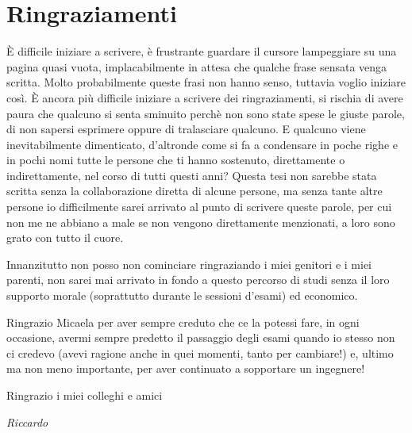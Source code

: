 \chapter*{Ringraziamenti}
È difficile iniziare a scrivere, è frustrante guardare il cursore lampeggiare 
su una pagina quasi vuota, implacabilmente in attesa che qualche frase sensata 
venga scritta. Molto probabilmente queste frasi non hanno senso, tuttavia 
voglio iniziare così. È ancora più difficile iniziare a scrivere dei 
ringraziamenti, si rischia di avere paura che qualcuno si senta sminuito perchè 
non sono state spese le giuste parole, di non sapersi esprimere oppure di 
tralasciare qualcuno. E qualcuno viene inevitabilmente dimenticato, d'altronde 
come si fa a condensare in poche righe e in pochi nomi tutte le persone che ti 
hanno sostenuto, direttamente o indirettamente, nel corso di tutti questi anni? 
Questa tesi non sarebbe stata scritta senza la collaborazione diretta di alcune 
persone, ma senza tante altre persone io difficilmente sarei arrivato al punto 
di scrivere queste parole, per cui non me ne abbiano a male se non vengono 
direttamente menzionati, a loro sono grato con tutto il cuore.

Innanzitutto non posso non cominciare ringraziando i miei genitori e i miei 
parenti, non sarei mai arrivato in fondo a questo percorso di studi senza il 
loro supporto morale (soprattutto durante le sessioni d'esami) ed economico.

Ringrazio Micaela per aver sempre creduto che ce la potessi fare, in ogni 
occasione, avermi sempre predetto il passaggio degli esami quando io stesso 
non ci credevo (avevi ragione anche in quei momenti, tanto per cambiare!) e, 
ultimo ma non meno importante, per aver continuato a sopportare un ingegnere!

Ringrazio i miei colleghi e amici 

\vspace{1.5em}
\begin{flushright}
 \textit{Riccardo}
\end{flushright}
